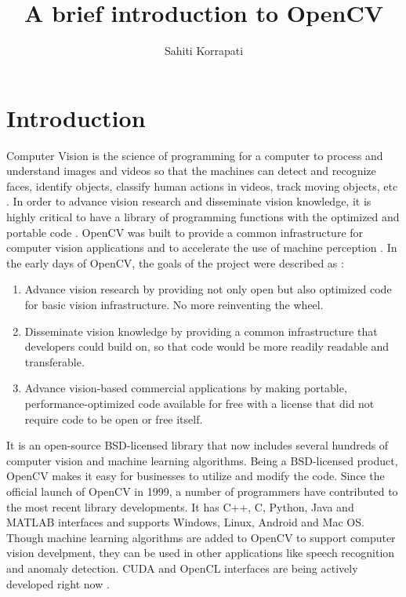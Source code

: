 \documentclass[9pt,twocolumn,twoside]{../../styles/osajnl}
\title{A brief introduction to OpenCV}
\author[1,*]{Sahiti Korrapati}
\affil[1]{School of Informatics and Computing, Bloomington, IN 47408, U.S.A.}
\affil[*]{Corresponding authors: sakorrap@iu.edu, S17-IR-2013}
\begin{document}
\maketitle
\section{Introduction}
Computer Vision is the science of programming for a computer to process and understand images and videos so that the machines can detect and recognize faces, identify objects, classify human actions in videos, track moving objects, etc \cite{www-about}. In order to advance vision research and disseminate vision knowledge, it is highly critical to have a library of programming functions with the optimized and portable code \cite{opencv-paper}. OpenCV was built to provide a common infrastructure for computer vision applications and to accelerate the use of machine perception \cite{www-about}. \newline In the early days of OpenCV, the goals of the project were described as \cite{www-opencv-wiki}:
\begin{enumerate}
    \item Advance vision research by providing not only open but also optimized code for basic vision infrastructure. No more reinventing the wheel.
    \item Disseminate vision knowledge by providing a common infrastructure that developers could build on, so that code would be more readily readable and transferable.
    \item Advance vision-based commercial applications by making portable, performance-optimized code available for free with a license that did not require code to be open or free itself.
\end{enumerate}

It is an open-source BSD-licensed library that now includes several hundreds of computer vision and machine learning algorithms. Being a BSD-licensed product, OpenCV makes it easy for businesses to utilize and modify the code. Since the official launch of OpenCV in 1999, a number of programmers have contributed to the most recent library developments. It has C++, C, Python, Java and MATLAB interfaces and supports Windows, Linux, Android and Mac OS. Though machine learning algorithms are added to OpenCV to support computer vision develpment, they can be used in other applications like speech recognition and anomaly detection. CUDA and OpenCL interfaces are being actively developed right now \cite{www-about}.
\end{document}
